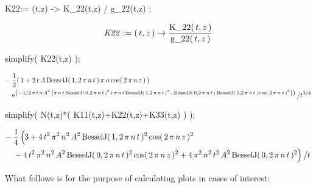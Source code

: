 \begin{mapleinput}
K22:= (t,z) -> K_22(t,z) / g_22(t,z) ;
\end{mapleinput}
\begin{maplelatex}
\[
{\it K22} := (\,{t}, {z}\,) \rightarrow {\displaystyle \frac {
{\rm K\_22}(\,{t}, {z}\,)}{{\rm g\_22}(\,{t}, {z}\,)}}
\]
\end{maplelatex}
\begin{mapleinput}
simplify( K22(t,z) );
\end{mapleinput}
\begin{maplelatex}
\begin{eqnarray*}
\lefteqn{ - \,{\displaystyle \frac {1}{2}}(\,1 + 2\,{t}\,{A}\,
{\rm BesselJ}(\,1, 2\,{ \pi}\,{n}\,{t}\,)\,{ \pi}\,{n}\,{\rm cos}
(\,2\,{ \pi}\,{n}\,{z}\,)\,)} \\
 & & {\rm e}^{ \left( \! \, - \,1/2\,{ \pi}\,{t}\,{n}\,{A}^{2}\,
 \left( \! \,{ \pi}\,{n}\,{t}\,{\rm BesselJ}(\,0, 2\,{ \pi}\,{n}
\,{t}\,)^{2} + { \pi}\,{n}\,{t}\,{\rm BesselJ}(\,1, 2\,{ \pi}\,{n
}\,{t}\,)^{2} - {\rm BesselJ}(\,0, 2\,{ \pi}\,{n}\,{t}\,)\,{\rm 
BesselJ}(\,1, 2\,{ \pi}\,{n}\,{t}\,)\,{\rm cos}(\,2\,{ \pi}\,{n}
\,{z}\,)^{2}\, \!  \right) \, \!  \right) } \left/ {\vrule 
height0.37em width0em depth0.37em} \right. \! \! {t}^{3/4}
\end{eqnarray*}
\end{maplelatex}
\begin{mapleinput}
simplify( N(t,z)*( K11(t,z)+K22(t,z)+K33(t,z) ) );
\end{mapleinput}
\begin{maplelatex}
\begin{eqnarray*}
\lefteqn{ - \,{\displaystyle \frac {1}{4}} \left( {\vrule 
height0.44em width0em depth0.44em} \right. \! \! 3 + 4\,{t}^{2}\,
{ \pi}^{2}\,{n}^{2}\,{A}^{2}\,{\rm BesselJ}(\,1, 2\,{ \pi}\,{n}\,
{t}\,)^{2}\,{\rm cos}(\,2\,{ \pi}\,{n}\,{z}\,)^{2}} \\
 & & \mbox{} - 4\,{t}^{2}\,{ \pi}^{2}\,{n}^{2}\,{A}^{2}\,{\rm 
BesselJ}(\,0, 2\,{ \pi}\,{n}\,{t}\,)^{2}\,{\rm cos}(\,2\,{ \pi}\,
{n}\,{z}\,)^{2} + 4\,{ \pi}^{2}\,{n}^{2}\,{t}^{2}\,{A}^{2}\,{\rm 
BesselJ}(\,0, 2\,{ \pi}\,{n}\,{t}\,)^{2} \! \! \left. {\vrule 
height0.44em width0em depth0.44em} \right)  \left/ {\vrule 
height0.37em width0em depth0.37em} \right. \! \! {t}
\end{eqnarray*}
\end{maplelatex}
What follows is for the purpose of calculating plots in cases of interest:

